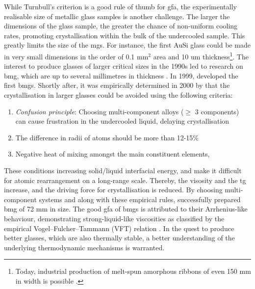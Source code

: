 While Turnbull's criterion is a good rule of thumb for \gls{gfa}, the experimentally realisable size of metallic glass samples is another challenge. The larger the dimensions of the glass sample, the greater the chance of non-uniform cooling rates, promoting crystallisation within the bulk of the undercooled sample. This greatly limits the size of the \gls{mg}s. For instance, the first AuSi glass could be made in very small dimensions in the order of 0.1 mm$^2$ area and 10 \gls{um} thickness\footnote{Today, industrial production of melt-spun amorphous ribbons of even 150 mm in width is possible \cite{Wu2014}.}. The interest to produce glasses of larger critical sizes in the 1990s led to research on \gls{bmg}, which are up to several millimetres in thickness \cite{Johnson1999,Greer2007,Inoue2000}. In 1999, \textcite{Johnson1999} developed the first \glspl{bmg}. Shortly after, it was empirically determined in 2000 by \textcite{Inoue2000} that the crystallisation in larger glasses could be avoided using the following criteria:
\begin{enumerate}[noitemsep]
	\item \textit{Confusion principle}: Choosing multi-component alloys ($\ge$ 3 components) can cause frustration in the undercooled liquid, delaying crystallisation
	\item The difference in radii of atoms should be more than 12-15\% 
	\item Negative heat of mixing amongst the main constituent elements, 
\end{enumerate}
These conditions increasing solid/liquid interfacial energy, and make it difficult for atomic rearrangement on a long-range scale. Thereby, the visosity and the \gls{tg} increase, and the driving force for crystallisation is reduced. By choosing multi-component systems and along with these empirical rules, \textcite{Inoue2000} successfully prepared \gls{bmg} of 72 mm in size. The good \gls{gfa} of \gls{bmg}s is attributed to their Arrhenius-like behaviour, demonstrating strong-liquid-like viscosities as classified by the empirical Vogel–Fulcher–Tammann (VFT) relation \cite{Debenedetti2001,Wang2004a}. In the quest to produce better glasses, which are also thermally stable, a better understanding of the underlying thermodynamic mechanisms is warranted. \par

